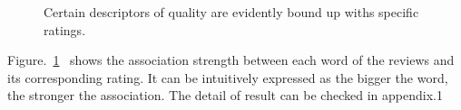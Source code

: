 \documentclass[12pt]{article}%
\begin{document}
\begin{figure}[H]
	\centering
	
	\caption{Certain descriptors of quality are evidently bound up withs specific ratings.}
	\label{fig2}
\end{figure}
Figure.~\ref{fig2}~ shows the association strength between each word of the reviews and its corresponding rating. It can be intuitively expressed as the bigger the word, the stronger the association. The detail of result can be checked in appendix.1 
\end{document}
